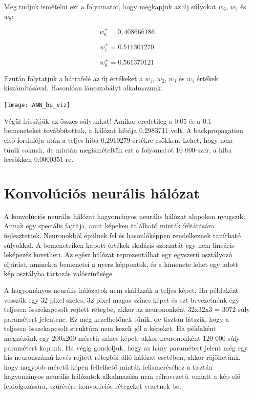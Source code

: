 Meg tudjuk ismételni ezt a folyamatot, hogy megkapjuk az új súlyokat $w_6$, $w_7$ és $w_8$:

\[w_6 ^ {+} = 0,408666186\]

\[w_7 ^ {+} = 0.511301270\]

\[w_8 ^ {+} = 0.561370121\]

Ezután folytatjuk a hátrafelé az új értékeket a $w_1$, $w_2$, $w_3$ és $w_4$ értékek kiszámításával. Hasonlóan láncszabályt alkalmazunk.\\

\begin{center}
\texttt{[image: ANN\_bp\_viz]}
\end{center}

Végül frissítjük az összes súlyunkat! Amikor eredetileg a 0.05 és a 0.1 bemeneteket továbbítottuk, a hálózat hibája 0.2983711 volt. A backpropagation első fordulója után a teljes hiba 0,2910279 értékre csökken. Lehet, hogy nem tűnik soknak, de miután megismételtük ezt a folyamatot 10 000-szer, a hiba lecsökken 0,0000351-re.\\

\section{Konvolúciós neurális hálózat}

A konvolúciós neurális hálózat hagyományos neurális hálózat alapokon nyugszik. Annak egy speciális fajtája, amit képeken található minták feltárására fejlesztettek. Neuronokból épülnek fel és hasonlóképpen rendelkeznek tanítható súlyokkal. A bemeneteiken kapott értékek skaláris szorzatát egy nem lineáris leképezés követheti. Az egész hálózat reprezentálhat egy egyszerű osztályozó eljárást, aminek a bemenetei a nyers képpontok, és a kimenete lehet egy adott kép osztályba tartozás valószínűsége.

A hagyományos neurális hálózatok nem skálázzák a teljes képet. Ha példaként vesszük egy 32 pixel széles, 32 pixel magas színes képet és ezt bevezetnénk egy teljesen összekapcsolt rejtett rétegbe, akkor az neurononként 32x32x3 = 3072 súly paramétert jelentene. Ez még kezelhetőnek tűnik, de tisztán látszik, hogy a teljesen összekapcsolt struktúra nem kezeli jól a képeket. Ha példaként megnézünk egy 200x200 méretű színes képet, akkor neurononként 120 000 súly paramétert kapunk. Ha végig gondoljuk, hogy az hány paramétert jelent még egy kis neuronszámú kevés rejtett rétegből álló hálózat esetében, akkor rájöhetünk, hogy nagyobb méretű képen fellelhető minták felismeréséhez a tisztán hagyományos neurális hálózatok alkalmazása nem célravezető, emiatt a kép elő feldolgozására, szűrésére konvolúciós rétegeket vezetnek be.

